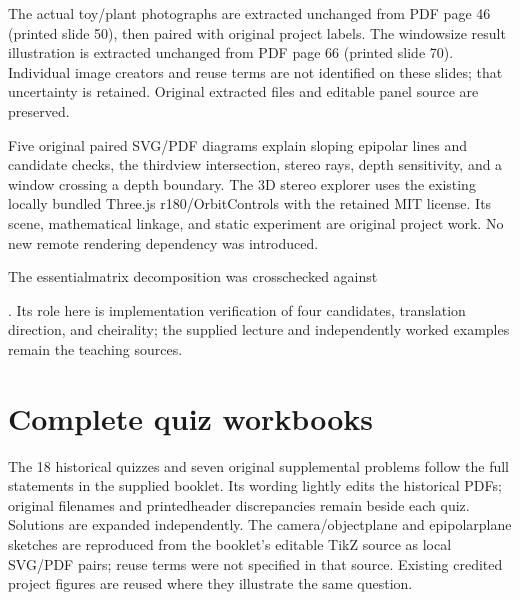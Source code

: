\documentclass[letterpaper,11pt,english,openany,oneside]{jupyterBook}
\begin{document}
\sphinxAtStartPar
The actual toy/plant photographs are extracted unchanged from PDF page 46 (printed slide 50), then paired with original project labels. The window\sphinxhyphen{}size result illustration is extracted unchanged from PDF page 66 (printed slide 70). Individual image creators and reuse terms are not identified on these slides; that uncertainty is retained. Original extracted files and editable panel source are preserved.

\sphinxAtStartPar
Five original paired SVG/PDF diagrams explain sloping epipolar lines and candidate checks, the third\sphinxhyphen{}view intersection, stereo rays, depth sensitivity, and a window crossing a depth boundary. The 3D stereo explorer uses the existing locally bundled Three.js r180/OrbitControls with the retained MIT license. Its scene, mathematical linkage, and static experiment are original project work. No new remote rendering dependency was introduced.

\sphinxAtStartPar
The essential\sphinxhyphen{}matrix decomposition was cross\sphinxhyphen{}checked against %
\begin{footnote}[6]\sphinxAtStartFootnote
{}
%
\end{footnote}. Its role here is implementation verification of four candidates, translation direction, and cheirality; the supplied lecture and independently worked examples remain the teaching sources.


\section{Complete quiz workbooks}
\label{\detokenize{reference/credits:complete-quiz-workbooks}}
\sphinxAtStartPar
The 18 historical quizzes and seven original supplemental problems follow the full statements in the supplied  booklet. Its wording lightly edits the historical PDFs; original filenames and printed\sphinxhyphen{}header discrepancies remain beside each quiz. Solutions are expanded independently. The camera/object\sphinxhyphen{}plane and epipolar\sphinxhyphen{}plane sketches are reproduced from the booklet’s editable TikZ source as local SVG/PDF pairs; reuse terms were not specified in that source. Existing credited project figures are reused where they illustrate the same question.
\end{document}
